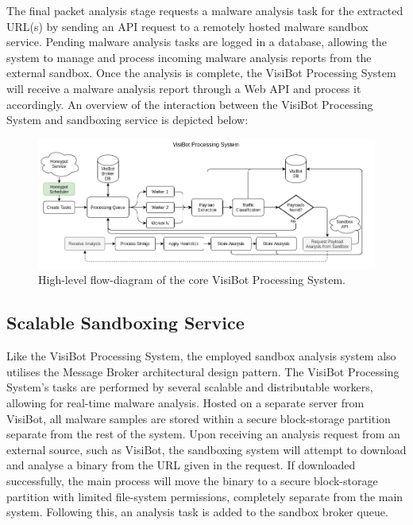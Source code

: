 The final packet analysis stage requests a malware analysis task for the extracted URL(s) by sending an API request to a remotely hosted malware sandbox service. Pending malware analysis tasks are logged in a database, allowing the system to manage and process incoming malware analysis reports from the external sandbox. Once the analysis is complete, the VisiBot Processing System will receive a malware analysis report through a Web API and process it accordingly. An overview of the interaction between the VisiBot Processing System and sandboxing service is depicted below:

\begin{figure}[!htb]
    \centering
    \includegraphics[width=0.9\linewidth]{flowcharts/high_level_processing_overview.png}
    \caption{High-level flow-diagram of the core VisiBot Processing System.}
    \label{fig:high_level_proc_overview} 
\end{figure}

\subsection{Scalable Sandboxing Service}

Like the VisiBot Processing System, the employed sandbox analysis system also utilises the Message Broker architectural design pattern. The VisiBot Processing System's tasks are performed by several scalable and distributable workers, allowing for real-time malware analysis. Hosted on a separate server from VisiBot, all malware samples are stored within a secure block-storage partition separate from the rest of the system. Upon receiving an analysis request from an external source, such as VisiBot, the sandboxing system will attempt to download and analyse a binary from the URL given in the request. If downloaded successfully, the main process will move the binary to a secure block-storage partition with limited file-system permissions, completely separate from the main system. Following this, an analysis task is added to the sandbox broker queue.

